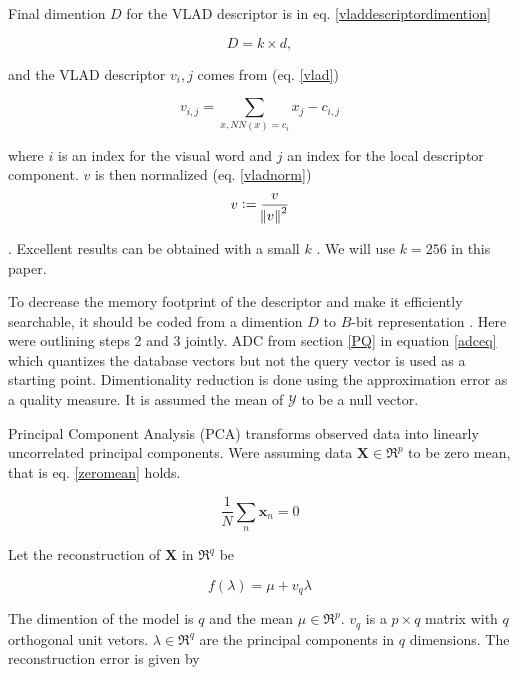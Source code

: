 \documentclass[english,12pt,a4paper,pdftex,elec,utf8]{aaltothesis}
\begin{document}
Final dimention $D$ for the VLAD descriptor is in eq. \ref{vladdescriptordimention}

\begin{equation}
  \label{vladdescriptordimention}
  D = k \times d,
\end{equation}

and the VLAD descriptor $v_i,j$ comes from (eq. \ref{vlad})

\begin{equation}
  \label{vlad}
  v_{i,j} = \sum_{x, NN(x)=c_i} x_j - c_{i,j}
\end{equation}

where $i$ is an index for the visual word and $j$ an index for the local descriptor component. $v$ is then normalized (eq. \ref{vladnorm})
\begin{equation}
  \label{vladnorm}
  v := \frac{v}{\norm{v}^2}
  \end{equation}

.\cite{Jegou2014} Excellent results can be obtained with a small $k$ \cite{Jegou2014}. We will use $k=256$ in this paper.

To decrease the memory footprint of the descriptor and make it efficiently searchable, it should be coded from a dimention $D$ to $B$-bit representation \cite{Jegou2014}. Here were outlining steps 2 and 3 jointly. ADC from section \ref{PQ} in equation \ref{adceq} which quantizes the database vectors but not the query vector is used as a starting point. Dimentionality reduction is done using the approximation error as a quality measure. It is assumed the mean of $\mathcal{Y}$ to be a null vector.\cite{Jegou2014}

Principal Component Analysis (PCA) transforms observed data into linearly uncorrelated principal components. Were assuming data $\boldsymbol{X} \in \Re^{p}$ to be zero mean, that is eq. \ref{zeromean} holds.

\begin{equation}\label{zeromean}
\frac{1}{N}\sum_n \boldsymbol{x}_n = 0
\end{equation}

Let the reconstruction of $\boldsymbol{X}$ in $\Re^{q}$ be

\begin{equation} \label{pca}
f(\lambda) = \mu + v_q\lambda
\end{equation}

The dimention of the model is $q$ and the mean $\mu \in \Re^p$. $v_q$ is a $p \times q$ matrix with $q$ orthogonal unit vetors. $\lambda \in \Re^q$ are the principal components in $q$ dimensions. The reconstruction error is given by
\end{document}
